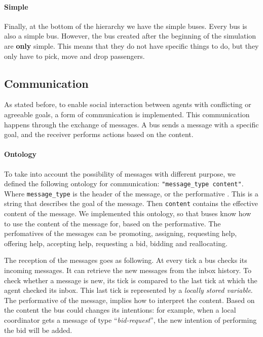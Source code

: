 \paragraph{Simple}

Finally, at the bottom of the hierarchy we have the simple buses. Every bus is also a simple bus. However, the bus created after the beginning of the simulation are \textbf{only} simple. This means that they do not have specific things to do, but they only have to pick, move and drop passengers. 

\subsection{Communication}

As stated before, to enable social interaction between agents with conflicting or agreeable goals, a form of communication is implemented. This communication happens through the exchange of messages. A bus sends a message with a specific goal, and the receiver performs actions based on the content.

\paragraph{Ontology}

To take into account the possibility of messages with different purpose, we defined the following ontology for communication: \texttt{"message\_type content"}. Where  \texttt{message\_type} is the header of the message, or the performative \cite{fipa}. This is a string that describes the goal of the message. Then \texttt{content} contains the effective content of the message. We implemented this ontology, so that buses know how to use the content of the message for, based on the performative. The perfomatives of the messages can be promoting, assigning, requesting help, offering help, accepting help, requesting a bid, bidding and reallocating. 

The reception of the messages goes as following. At every tick a bus checks its incoming messages. It can retrieve the new messages from the inbox history. To check whether a message is new, its tick is compared to the last tick at which the agent checked its inbox. This last tick is represented by a \textit{locally stored variable}. The performative of the message, implies how to interpret the content. Based on the content the bus could changes its intentions: for example, when a local coordinator gets a message of type ``\textit{bid-request}'', the new intention of performing the bid will be added.

